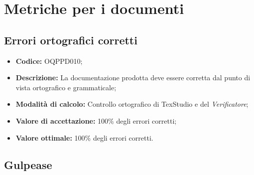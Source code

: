 \documentclass[openany,12pt,a4paper]{report}
\begin{document}

\section{Metriche per i documenti}

\subsection{Errori ortografici corretti}

\begin{itemize}
    \item \textbf{Codice:} OQPPD010;
    \item \textbf{Descrizione:} La documentazione prodotta deve essere corretta dal punto di vista ortografico e grammaticale;
    \item \textbf{Modalità di calcolo:} Controllo ortografico di TexStudio e del \textit{Verificatore};
    \item \textbf{Valore di accettazione:} 100\% degli errori corretti;
    \item \textbf{Valore ottimale:} 100\% degli errori corretti.
\end{itemize}

\subsection{Gulpease}
\end{document}
